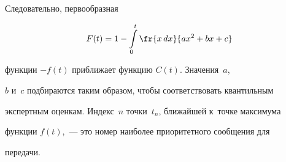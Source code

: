 

  


  


  


  \noindent


  Следовательно, первообразная  


  


  \noindent


    $$


  F(t)= 1- \int\limits_0^t  \fr{x\,dx}{ax^2+bx+c}


  $$ 


  


  \vspace*{-3pt}


  


  \noindent


  функции $-f(t)$ приближает функцию $C(t)$. Значения~$a$, 


$b$ и~$c$ подбираются таким образом, чтобы соответствовать квантильным 


экспертным оценкам. Индекс~$n$ точки~$t_n$, ближайшей к~точке максимума 


функции $f(t)$,~--- это номер наиболее приоритетного сообщения для 


передачи.



